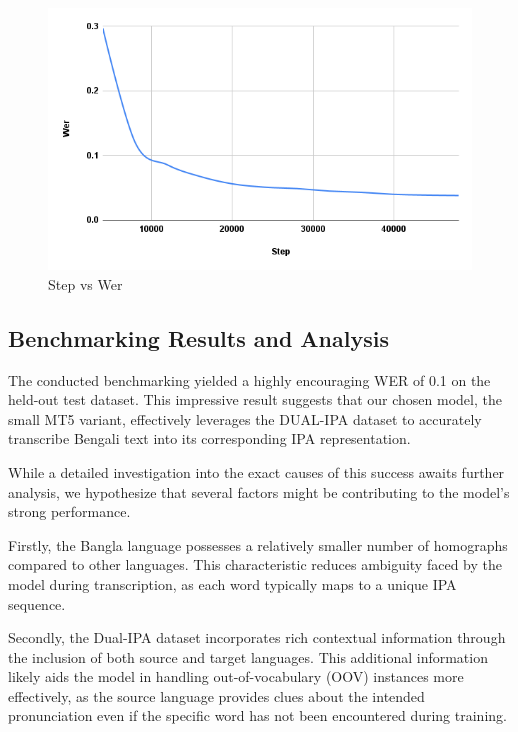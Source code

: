  \begin{figure}[htbp]
    \centering
    \includegraphics[width=\textwidth]{Images/Graph/Step vs Wer.png}
    \caption{Step vs Wer}
    \label{fig:project-flow}
\end{figure} 





\subsection{Benchmarking Results and Analysis}

The conducted benchmarking yielded a highly encouraging WER of 0.1 on the held-out test dataset. This impressive result suggests that our chosen model, the small MT5 variant, effectively leverages the DUAL-IPA dataset to accurately transcribe Bengali text into its corresponding IPA representation.

While a detailed investigation into the exact causes of this success awaits further analysis, we hypothesize that several factors might be contributing to the model's strong performance.

Firstly, the Bangla language possesses a relatively smaller number of homographs compared to other languages. This characteristic reduces ambiguity faced by the model during transcription, as each word typically maps to a unique IPA sequence.

Secondly, the Dual-IPA dataset incorporates rich contextual information through the inclusion of both source and target languages. This additional information likely aids the model in handling out-of-vocabulary (OOV) instances more effectively, as the source language provides clues about the intended pronunciation even if the specific word has not been encountered during training.

